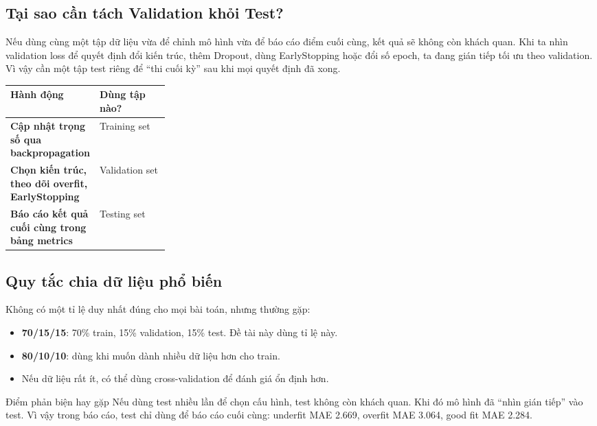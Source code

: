 \documentclass[12pt,a4paper]{article}
\newcommand{\term}[1]{\textbf{#1}}
\begin{document}
\subsection{Tại sao cần tách Validation khỏi Test?}

Nếu dùng cùng một tập dữ liệu vừa để chỉnh mô hình vừa để báo cáo điểm cuối cùng, kết quả sẽ không còn khách quan. Khi ta nhìn validation loss để quyết định đổi kiến trúc, thêm Dropout, dùng EarlyStopping hoặc đổi số epoch, ta đang gián tiếp tối ưu theo validation. Vì vậy cần một tập test riêng để ``thi cuối kỳ'' sau khi mọi quyết định đã xong.

\begin{center}
\begin{tabularx}{0.95\linewidth}{>{\bfseries}p{0.27\linewidth}X}
\toprule
Hành động & Dùng tập nào? \\
\midrule
Cập nhật trọng số qua backpropagation & Training set \\
Chọn kiến trúc, theo dõi overfit, EarlyStopping & Validation set \\
Báo cáo kết quả cuối cùng trong bảng metrics & Testing set \\
\bottomrule
\end{tabularx}
\end{center}

\subsection{Quy tắc chia dữ liệu phổ biến}

Không có một tỉ lệ duy nhất đúng cho mọi bài toán, nhưng thường gặp:

\begin{itemize}
    \item \term{70/15/15}: 70\% train, 15\% validation, 15\% test. Đề tài này dùng tỉ lệ này.
    \item \term{80/10/10}: dùng khi muốn dành nhiều dữ liệu hơn cho train.
    \item Nếu dữ liệu rất ít, có thể dùng cross-validation để đánh giá ổn định hơn.
\end{itemize}

\begin{warnbox}{Điểm phản biện hay gặp}
Nếu dùng test nhiều lần để chọn cấu hình, test không còn khách quan. Khi đó mô hình đã ``nhìn gián tiếp'' vào test. Vì vậy trong báo cáo, test chỉ dùng để báo cáo cuối cùng: underfit MAE 2.669, overfit MAE 3.064, good fit MAE 2.284.
\end{warnbox}
\end{document}
